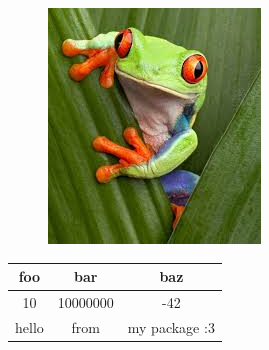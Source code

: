 \documentclass{article}
\begin{document}
		\begin{figure}[H]
		\centering
		\includegraphics[width=0.50\linewidth]{frog.jpeg}
		\end{figure}

		\begin{table}[h]
		    \centering
		    \begin{tabular}{|c|c|c|}
				\hline
				foo & bar & baz\\
				\hline
				10 & 10000000 & -42\\
				\hline
				hello & from & my package :3\\
				\hline
		    \end{tabular}
		\end{table}
\end{document}
